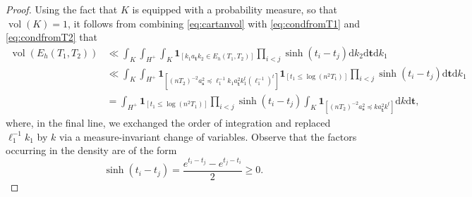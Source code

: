 \documentclass[11pt,reqno]{amsart}
\theoremstyle{definition}
\theoremstyle{remark}
\newcommand{\vol}{\operatorname{vol}}
\numberwithin{equation}{section}
\numberwithin{thm}{section}
\numberwithin{table}{section}
\begin{document}
\begin{proof}
    

    Using the fact that $K$ is equipped with a probability measure, so that $\vol (K)=1$, it follows from combining \eqref{eq:cartanvol}  with \eqref{eq:condfromT1} and \eqref{eq:condfromT2} that
\begin{align}
    \vol(E_h(T_1,T_2)) 
    &\ll \int_K \int_{H^{+}}\int_K \mathbf{1}_{[ k_1 a_{\mathbf{t}} k_2 \in E_h(T_1,T_2)]} \prod_{i<j} \sinh(t_i - t_j) \mathrm{d} k_2 \mathrm{d}\mathbf{t}\mathrm{d}k_1  \nonumber
    \\ 
    &\ll
     \int_K \int_{H^{+}}  \mathbf{1}_{[  (nT_2)^{-2} a_{\mathbf{s}}^2 \preceq \ell_1^{-1} k_1 a_{\mathbf{t}}^2 k_1^t (\ell_1^{-1})^{t} ]} \mathbf{1}_{[t_1 \le  \log(n^2 T_1)]}\prod_{i<j} \sinh(t_i - t_j)\mathrm{d}\mathbf{t}\mathrm{d}k_1 \nonumber
     \\
     &=
      \int_{H^{+}} 
      \mathbf{1}_{[t_1 \le \log(n^2T_1)]} \prod_{i<j} \sinh(t_i - t_j)
      \int_K  \mathbf{1}_{[ (nT_2)^{-2} a_{\mathbf{s}}^2 \preceq  k a_{\mathbf{t}}^2 k^t ]} \mathrm{d}k \mathrm{d}\mathbf{t}, \label{eq:volumeEh_intermediatestep}
\end{align}
where, in the final line, we exchanged the order of integration and replaced $\ell_1^{-1} k_1$ by $k$ via a measure-invariant change of variables. Observe that the factors occurring in the density are of the form
\[
    \sinh(t_i - t_j) = \frac{e^{t_i-t_j}-e^{t_j-t_i}}{2} \ge 0.
\]


\end{proof}
\end{document}
